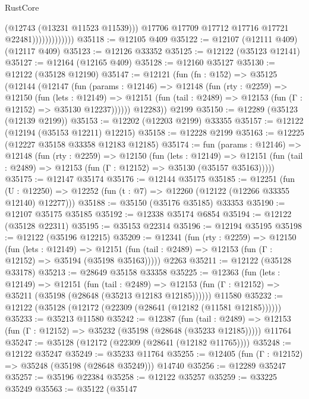 \begin{lexlean}{RustCore}
\begin{coremodule}
                                (@12743 (@13231 @11523 @11539)))
                              @17706
                              @17709
                              @17712
                              @17716
                              @17721
                              @22481)))))))))))))
@35118 := @12105 @409
@35122 := @12107 (@12111 @409) (@12117 @409)
@35123 := @12126 @33352
@35125 := @12122 (@35123 @12141)
@35127 := @12164 (@12165 @409)
@35128 := @12160 @35127
@35130 := @12122 (@35128 @12190)
@35147 := @12121
    (fun (fn : @152) =>
    @35125
      (@12144
        (@12147
          (fun (params : @12146) =>
          @12148
            (fun (rty : @2259) =>
            @12150
              (fun (lets : @12149) =>
              @12151 (fun (tail : @2489) => @12153 (fun (Γ : @12152) => @35130 @12237))))))
        @12283))
    @2199
@35150 := @12289 (@35123 (@12139 @2199))
@35153 := @12202 (@12203 @2199) @33355
@35157 := @12122 (@12194 (@35153 @12211) @12215)
@35158 := @12228 @2199
@35163 := @12225 (@12227 @35158 @33358 @12183 @12185)
@35174 := fun (params : @12146) =>
  @12148
    (fun (rty : @2259) =>
    @12150
      (fun (lets : @12149) =>
      @12151 (fun (tail : @2489) => @12153 (fun (Γ : @12152) => @35130 (@35157 @35163)))))
@35175 := @12147 @35174
@35176 := @12144 @35175
@35185 := @12251
    (fun (U : @12250) => @12252 (fun (t : @7) => @12260 (@12122 (@12266 @33355 @12140) @12277)))
@35188 := @35150 (@35176 @35185) @33353
@35190 := @12107 @35175 @35185
@35192 := @12338 @35174 @6854
@35194 := @12122 (@35128 @22311)
@35195 := @35153 @22314
@35196 := @12194 @35195
@35198 := @12122 (@35196 @12215)
@35209 := @12341
    (fun (rty : @2259) =>
    @12150
      (fun (lets : @12149) =>
      @12151 (fun (tail : @2489) => @12153 (fun (Γ : @12152) => @35194 (@35198 @35163)))))
    @2263
@35211 := @12122 (@35128 @33178)
@35213 := @28649 @35158 @33358
@35225 := @12363
    (fun (lets : @12149) =>
    @12151
      (fun (tail : @2489) =>
      @12153 (fun (Γ : @12152) => @35211 (@35198 (@28648 (@35213 @12183 @12185))))))
    @11580
@35232 := @12122 (@35128 (@12172 (@22309 (@28641 (@12182 (@11581 @12185))))))
@35233 := @35213 @11580
@35242 := @12387
    (fun (tail : @2489) => @12153 (fun (Γ : @12152) => @35232 (@35198 (@28648 (@35233 @12185)))))
    @11764
@35247 := @35128 (@12172 (@22309 (@28641 (@12182 @11765))))
@35248 := @12122 @35247
@35249 := @35233 @11764
@35255 := @12405 (fun (Γ : @12152) => @35248 (@35198 (@28648 @35249))) @14740
@35256 := @12289 @35247
@35257 := @35196 @22384
@35258 := @12122 @35257
@35259 := @33225 @35249
@35563 := @35122
    (@35147

\end{coremodule}
\end{lexlean}
